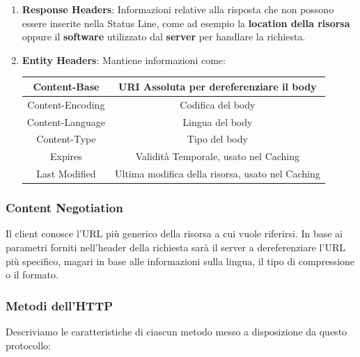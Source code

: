 \documentclass{article}
\begin{document}
\begin{enumerate}
\begin{enumerate}
        \vspace*{5px}
        
        \item \textbf{Response Headers}: Informazioni relative alla risposta che non possono essere
        inserite nella Status Line, come ad esempio la \textbf{location della risorsa} oppure il \textbf{software} utilizzato dal
        \textbf{server} per handlare la richiesta.
        \newpage
        \item \textbf{Entity Headers}: Mantiene informazioni come:
        
        \begin{center}
        \begin{tabular}{ |c|c| } 
        \hline
        Content-Base & URI Assoluta per dereferenziare il body \\ 
        \hline
        Content-Encoding & Codifica del body \\ 
        \hline
        Content-Language & Lingua del body \\ 
        \hline
        Content-Type & Tipo del body \\ 
        \hline
        Expires & Validità Temporale, usato nel Caching \\ 
        \hline
        Last Modified & Ultima modifica della risorsa, usato nel Caching \\ 
        \hline
        \end{tabular}
        \end{center}

    \end{enumerate}
 
\end{enumerate}

\subsubsection{Content Negotiation}

Il client conosce l'URL più generico della risorsa a cui vuole riferirsi. In base ai parametri forniti nell'header della richiesta
sarà il server a dereferenziare l'URL più specifico, magari in base alle informazioni sulla lingua, il tipo di compressione o il formato.

\subsubsection{Metodi dell'HTTP}

Descriviamo le caratteristiche di ciascun metodo messo a disposizione da questo protocollo:
\end{document}
